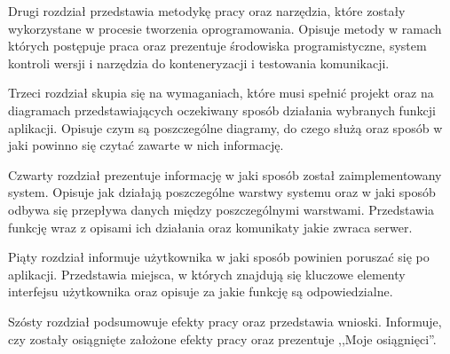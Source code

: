 Drugi rozdział przedstawia metodykę pracy oraz narzędzia, które zostały wykorzystane w procesie tworzenia oprogramowania. Opisuje metody w ramach których postępuje praca oraz prezentuje środowiska programistyczne, system kontroli wersji i narzędzia do konteneryzacji i testowania komunikacji. 

Trzeci rozdział skupia się na wymaganiach, które musi spełnić projekt oraz na diagramach przedstawiających oczekiwany sposób działania wybranych funkcji aplikacji. Opisuje czym są poszczególne diagramy, do czego służą oraz sposób w jaki powinno się czytać zawarte w nich informację. 

Czwarty rozdział prezentuje informację w jaki sposób został zaimplementowany system. Opisuje jak działają poszczególne warstwy systemu oraz w jaki sposób odbywa się przepływa danych między poszczególnymi warstwami. Przedstawia funkcję wraz z opisami ich działania oraz komunikaty jakie zwraca serwer. 

Piąty rozdział informuje użytkownika w jaki sposób powinien poruszać się po aplikacji. Przedstawia miejsca, w których znajdują się kluczowe elementy interfejsu użytkownika oraz opisuje za jakie funkcję są odpowiedzialne. 

Szósty rozdział podsumowuje efekty pracy oraz przedstawia wnioski. Informuje, czy zostały osiągnięte założone efekty pracy oraz prezentuje ,,Moje osiągnięci''.